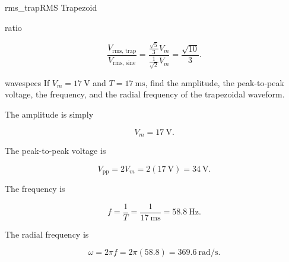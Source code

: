 \begin{mainquestion}{rms_trap}{RMS Trapezoid}
\begin{partquestion}{ratio}
\begin{answer}
\[
\frac{V_{\text{rms, trap}}}{V_{\text{rms, sine}}}
=
\frac{\frac{\sqrt5}{3}V_m}
{\frac{1}{\sqrt2}V_m}
=
\frac{\sqrt{10}}{3}.
\]

\end{answer}
\end{partquestion}

\begin{partquestion}{wavespecs}
{If $V_m=\qty{17}{\volt}$ and $T=\qty{17}{\milli\second}$, find the amplitude, the peak-to-peak voltage, the frequency, and the radial frequency of the trapezoidal waveform.}
\begin{answer}

The amplitude is simply

\[
V_m=\qty{17}{\volt}.
\]

The peak-to-peak voltage is

\[
V_{\text{pp}}
=
2V_m
=
2\left(\qty{17}{\volt}\right)
=
\qty{34}{\volt}.
\]

The frequency is

\[
f
=
\frac{1}{T}
=
\frac{1}{\qty{17}{\milli\second}}
=
\qty{58.8}{\hertz}.
\]

The radial frequency is

\[
\omega
=
2\pi f
=
2\pi(58.8)
=
\qty{369.6}{\radian\per\second}.
\]

\end{answer}
\end{partquestion}

\end{mainquestion}